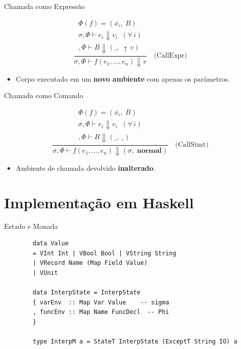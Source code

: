 \begin{frame}{Chamada como Expressão}

    \[\frac{\begin{array}{c}
    \Phi(f) = (\overline{x_i},\; B)\\
    \sigma,\Phi \vdash e_i \Downarrow v_i \;\;(\forall\, i)\\
    [x_1 \mapsto v_1,\ldots,x_n \mapsto v_n],\Phi \vdash B
    \Downarrow (\_,\; {\uparrow}\,v)
\end{array}}
{\sigma,\Phi \vdash f(e_1,\ldots,e_n) \Downarrow v}
\quad\text{(CallExpr)}\]

\begin{itemize}

    \item
    Corpo executado em um \textbf{novo ambiente} com apenas os parâmetros.
\end{itemize}
\end{frame}

\begin{frame}{Chamada como Comando}

    \[\frac{\begin{array}{c}
    \Phi(f) = (\overline{x_i},\; B)\\
    \sigma,\Phi \vdash e_i \Downarrow v_i \;\;(\forall\, i)\\
    [x_1 \mapsto v_1,\ldots,x_n \mapsto v_n],\Phi \vdash B \Downarrow (\_,\; \_)
\end{array}}
{\sigma,\Phi \vdash f(e_1,\ldots,e_n) \Downarrow (\sigma,\; \mathbf{normal})}
\quad\text{(CallStmt)}\]

\begin{itemize}

    \item
    Ambiente de chamada devolvido \textbf{inalterado}.
\end{itemize}
\end{frame}


\section{Implementação em
Haskell}\label{implementauxe7uxe3o-em-haskell-1}

\begin{frame}[fragile]{Estado e Monada}

    \begin{lstlisting}
        data Value
        = VInt Int | VBool Bool | VString String
        | VRecord Name (Map Field Value)
        | VUnit

        data InterpState = InterpState
        { varEnv  :: Map Var Value    -- sigma
        , funcEnv :: Map Name FuncDecl  -- Phi
        }

        type InterpM a = StateT InterpState (ExceptT String IO) a
    \end{lstlisting}
\end{frame}

